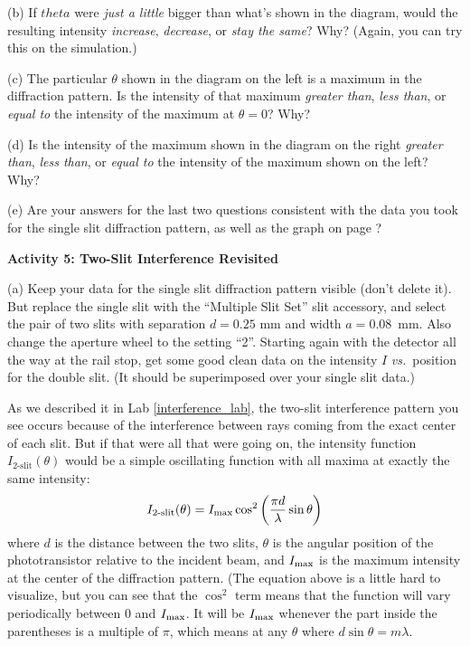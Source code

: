 (b) If $theta$ were \textit{just a little} bigger than what's shown in the diagram, would the resulting intensity \textit{increase}, \textit{decrease}, or \textit{stay the same}?  Why?  (Again, you can try this on the simulation.)
\answerspace{0.4in}

(c) The particular $\theta$ shown in the diagram on the left is a maximum in the diffraction pattern.  Is the intensity of that maximum \textit{greater than}, \textit{less than}, or \textit{equal to} the intensity of the maximum at $\theta = 0$?  Why?
\answerspace{0.4in}

\pagebreak[2]
(d) Is the intensity of the maximum shown in the diagram on the right \textit{greater than}, \textit{less than}, or \textit{equal to} the intensity of the maximum shown on the left?  Why?  
\answerspace{0.4in}

(e) Are your answers for the last two questions consistent with the data you took for the single slit diffraction pattern, as well as the graph on page \pageref{fraunhofer_graph}?
\answerspace{0.4in}


\pagebreak[2]
\medskip
\textbf{Activity 5: Two-Slit Interference Revisited}

(a) Keep your data for the single slit diffraction pattern visible (don't delete it).  But replace the single slit with the ``Multiple Slit Set'' slit accessory, and select the pair of two slits with separation $d=0.25$ mm and width $a=0.08$~mm.  Also change the aperture wheel to the setting ``2''.  Starting again with the detector all the way at the rail stop, get some good clean data on the intensity $I$ \textit{vs.}~position for the double slit.  (It should be superimposed over your single slit data.)

As we described it in Lab \ref{interference_lab}, the two-slit interference pattern you see occurs because of the interference between rays coming from the exact center of each slit.  But if that were all that were going on,
the intensity function $I_{\operatorname{2-slit}}(\theta)$ would be a simple oscillating function with all maxima at exactly the same intensity:
\begin{displaymath} 
I_{\operatorname{2-slit}}(\theta) = I_{\rm{max}} \cos^2 \left (\frac {\pi d} {\lambda} \sin \theta \right) 
\end{displaymath}
where $d$ is the distance between the two slits, \( \theta  \) is the angular
position of the phototransistor relative to the incident beam, and $I_{\rm{max}}$
is the maximum intensity at the center of the diffraction pattern. 
(The equation above is a little hard to visualize, but you can see that the $\cos ^2$ term means that the function will vary periodically between 0 and $I_{\rm max}$.  
It will be $I_{\rm max}$ whenever the part inside the parentheses is a multiple of $\pi$, 
which means at any $\theta$ where $d \sin \theta = m \lambda$. 

